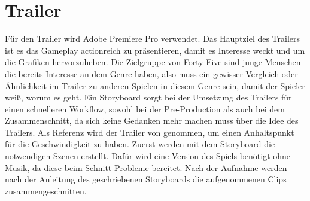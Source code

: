 \section{Trailer}\label{sec:trailer}

\renewcommand{\kapitelautor}{Autor: Markus Böheim}

Für den Trailer wird Adobe Premiere Pro verwendet.
Das Hauptziel des Trailers
ist es das Gameplay actionreich zu präsentieren, damit es Interesse weckt und um die Grafiken hervorzuheben.
Die Zielgruppe von Forty-Five sind junge Menschen die bereits Interesse an dem Genre haben, also muss ein gewisser
Vergleich oder Ähnlichkeit im Trailer zu anderen Spielen in diesem Genre sein, damit der Spieler weiß, worum es geht.
Ein Storyboard sorgt bei der Umsetzung des Trailers für einen
schnelleren Workflow, sowohl bei der Pre-Production als auch bei dem Zusammenschnitt, da sich keine Gedanken mehr machen muss über die Idee des Trailers.
Als Referenz wird der Trailer von  genommen, um einen Anhaltspunkt für die Geschwindigkeit zu haben.
Zuerst werden mit dem Storyboard die notwendigen Szenen erstellt.
Dafür wird eine Version des Spiels benötigt ohne Musik, da diese beim Schnitt Probleme bereitet.
Nach der Aufnahme werden nach der Anleitung des geschriebenen Storyboards die aufgenommenen Clips zusammengeschnitten.
